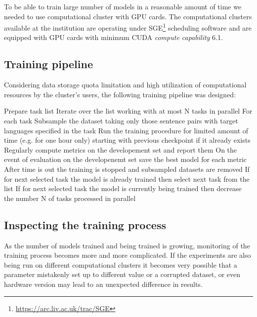 To be able to train large number of models in a reasonable amount of time we needed to use
computational cluster with GPU cards.
The computational clusters available at the institution are operating under
SGE\footnote{\url{https://arc.liv.ac.uk/trac/SGE}} scheduling software and are equipped with
GPU cards with minimum CUDA \textit{compute capability} 6.1.


\subsection{Training pipeline}
\label{section:training_pipeline}

Considering data storage quota limitation and high utilization of computational resources by
the cluster's users, the following training pipeline was designed:

\begin{outline}
    \1 Prepare task list
    \1 Iterate over the list working with at most N tasks in parallel
    \1 For each task
        \2 Subsample the dataset taking only those sentence pairs with target languages
	   specified in the task
	\2 Run the training procedure for limited amount of time (e.g. for one hour only)
	   starting with previous checkpoint if it already exists
	\2 Regularly compute metrics on the developement set and report them
	\2 On the event of evaluation on the developenemt set save the best model for each metric
	\2 After time is out the training is stopped and subsampled datasets are removed
    \1 If for next selected task the model is already trained then select next task from the list
    \1 If for next selected task the model is currently being trained then decrease
       the number N of tasks processed in parallel
\end{outline}


\subsection{Inspecting the training process}

As the number of models trained and being trained is growing, monitoring of the training
process becomes more and more complicated. If the experiments are also being run on different
computational clusters it becomes very possible that a parameter mistakenly set up to different
value or a corrupted dataset, or even hardware version may lead to an unexpected difference in results.

